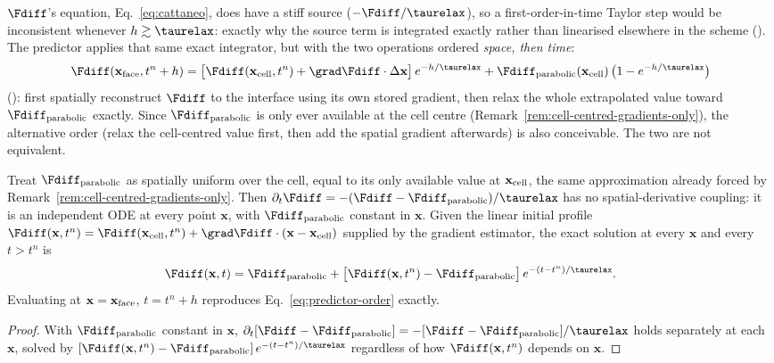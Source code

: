 $\Fdiff$'s equation, Eq.~\eqref{eq:cattaneo}, does have a stiff source
($-\Fdiff/\taurelax$), so a first-order-in-time Taylor step would be
inconsistent whenever $h\gtrsim\taurelax$: exactly why the source term
is integrated exactly rather than linearised elsewhere in the scheme
(). The predictor
applies that same exact integrator, but with the two operations ordered
\emph{space, then time}:
\begin{equation}
  \label{eq:predictor-order}
  \Fdiff(\mathbf x_{\rm face},t^n+h) =
  \big[\Fdiff(\mathbf x_{\rm cell},t^n)+\grad\Fdiff\cdot\Delta\mathbf x\big]\,
  e^{-h/\taurelax} + \Fdiff_{\rm parabolic}(\mathbf x_{\rm cell})\,
  \big(1-e^{-h/\taurelax}\big)
\end{equation}
(): first spatially reconstruct
$\Fdiff$ to the interface using its own stored gradient, then relax the
whole extrapolated value toward $\Fdiff_{\rm parabolic}$ exactly. Since $\Fdiff_{\rm parabolic}$
is only ever available at the cell centre
(Remark~\ref{rem:cell-centred-gradients-only}), the alternative order
(relax the cell-centred value first, then add the spatial gradient
afterwards) is also conceivable. The two are not equivalent.

\begin{proposition}
\label{prop:predictor}
Treat $\Fdiff_{\rm parabolic}$ as spatially uniform over the cell, equal to its only
available value at $\mathbf x_{\rm cell}$, the same approximation
already forced by Remark~\ref{rem:cell-centred-gradients-only}. Then
$\partial_t\Fdiff=-(\Fdiff-\Fdiff_{\rm parabolic})/\taurelax$ has no spatial-derivative
coupling: it is an independent ODE at every point $\mathbf x$, with
$\Fdiff_{\rm parabolic}$ constant in $\mathbf x$. Given the linear initial profile
$\Fdiff(\mathbf x,t^n)=\Fdiff(\mathbf x_{\rm cell},t^n)+\grad\Fdiff\cdot(\mathbf x-\mathbf x_{\rm cell})$
supplied by the gradient estimator, the exact solution at every
$\mathbf x$ and every $t>t^n$ is
\begin{equation}
  \Fdiff(\mathbf x,t) = \Fdiff_{\rm parabolic} +
  \big[\Fdiff(\mathbf x,t^n)-\Fdiff_{\rm parabolic}\big]\,e^{-(t-t^n)/\taurelax} .
\end{equation}
Evaluating at $\mathbf x=\mathbf x_{\rm face}$, $t=t^n+h$ reproduces
Eq.~\eqref{eq:predictor-order} exactly.
\end{proposition}
\begin{proof}
With $\Fdiff_{\rm parabolic}$ constant in $\mathbf x$,
$\partial_t[\Fdiff-\Fdiff_{\rm parabolic}]=-[\Fdiff-\Fdiff_{\rm parabolic}]/\taurelax$ holds
separately at each $\mathbf x$, solved by
$[\Fdiff(\mathbf x,t^n)-\Fdiff_{\rm parabolic}]\,e^{-(t-t^n)/\taurelax}$ regardless
of how $\Fdiff(\mathbf x,t^n)$ depends on $\mathbf x$.
\end{proof}

